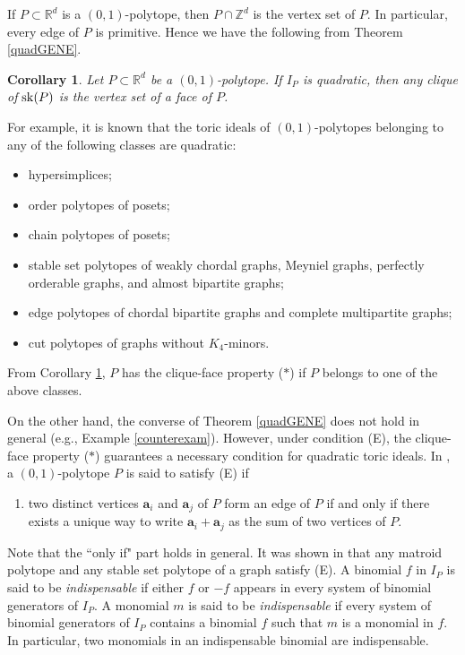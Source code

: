\documentclass[12pt]{amsart}
\newtheorem{cor}[thm]{Corollary}
\theoremstyle{definition}
\numberwithin{thm}{section}
\numberwithin{equation}{section}
\def\NZQ{\mathbb}               %
\def\ZZ{{\NZQ Z}}
\def\RR{{\NZQ R}}
\def\ab{{\mathbf a}}
\begin{document}
If $P \subset \RR^d$ is a $(0,1)$-polytope, then 
$P \cap \ZZ^d$ is the vertex set of $P$.
In particular, every edge of $P$ is primitive.
Hence we have the following from Theorem \ref{quadGENE}.

\begin{cor}\label{zero_one}
    Let $P \subset \RR^d$ be a $(0,1)$-polytope.
If $I_P$ is quadratic,
    then any clique of ${\rm sk}(P)$ is the vertex set of a face of $P$.
\end{cor}

For example, it is known that the toric ideals of $(0,1)$-polytopes belonging to any of the following classes are quadratic:
\begin{itemize}
\item 
hypersimplices;
    \item 
    order polytopes of posets;
    \item
    chain polytopes of posets;
    \item 
    stable set polytopes of weakly chordal graphs, Meyniel graphs,
    perfectly orderable graphs, and almost bipartite graphs;
    \item 
    edge polytopes of chordal bipartite graphs and complete multipartite graphs;
    \item 
    cut polytopes of graphs without $K_4$-minors.
\end{itemize}
From Corollary \ref{zero_one}, $P$ has the clique-face property ($*$) if $P$ belongs to one of the above classes.


On the other hand, the converse of Theorem \ref{quadGENE} does not hold in general (e.g., Example \ref{counterexam}).
However, under condition (E), the clique-face property ($*$) guarantees a necessary condition for quadratic toric ideals.
In \cite{propertyE}, a $(0,1)$-polytope $P$ is said to satisfy (E) if 

\medskip

\begin{enumerate}
    \item[(E)] 
 two distinct vertices $\ab_i$ and $\ab_j$ of $P$ form an edge of $P$ if and only if
 there exists a unique way to write $\ab_i+\ab_j$ as the sum of two vertices of $P$.
\end{enumerate}
    
\medskip

\noindent
Note that the ``only if" part holds in general.
 It was shown in \cite{propertyE} that any matroid polytope
 and any stable set polytope of a graph satisfy (E).
A binomial $f$ in $I_P$ is said to be {\it indispensable}
if either $f$ or $-f$ appears in every system of binomial generators of $I_P$.
 A monomial $m$ is said to be {\it indispensable} if every system of binomial generators of $I_P$ 
 contains a binomial $f$ such that $m$ is a monomial in $f$.
 In particular, two monomials in an indispensable binomial are indispensable.
\end{document}
